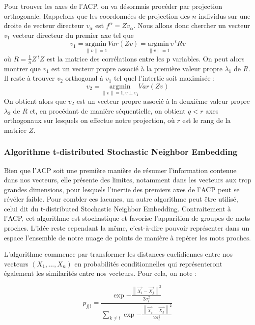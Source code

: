 \documentclass[11pt,french,french]{article}
\begin{document}
Pour trouver les axes de l'ACP, on va désormais procéder par projection
orthogonale. Rappelons que les coordonnées de projection des \(n\)
individus sur une droite de vecteur directeur \(v_\alpha\) est
\(f^\alpha = Zv_\alpha\). Nous allons donc chercher un vecteur \(v_1\)
vecteur directeur du premier axe tel que
\[v_1 =\underset{ \left\| v  \right\| = 1}{\mathrm{argmin~}} Var(Zv) =\underset{ \left\| v  \right\| = 1}{\mathrm{argmin~}} v\,^t R v \]
où \(R = \frac{1}{n} Z\,^t Z\) est la matrice des corrélations entre les
p variables. On peut alors montrer que \(v_1\) est un vecteur propre
associé à la première valeur propre \(\lambda_1\) de \(R\). Il reste à
trouver \(v_2\) orthogonal à \(v_1\) tel quel l'intertie soit maximisée
:
\[v_2 =\underset{ \left\| v  \right\| = 1, v \perp v_1}{\mathrm{argmin}} Var(Zv) \]
On obtient alors que \(v_2\) est un vecteur propre associé à la deuxième
valeur propre \(\lambda_2\) de \(R\) et, en procédant de manière
séquentielle, on obtient \(q < r\) axes orthogonaux sur lesquels on
effectue notre projection, où \(r\) est le rang de la matrice \(Z\).

\subsubsection{Algorithme t-distributed Stochastic Neighbor
Embedding}\label{algorithme-t-distributed-stochastic-neighbor-embedding}

Bien que l'ACP soit une première manière de résumer l'information
contenue dans nos vecteurs, elle présente des limites, notamment dans
les vecteurs aux trop grandes dimensions, pour lesquels l'inertie des
premiers axes de l'ACP peut se révéler faible. Pour combler ces lacunes,
un autre algorithme peut être utilisé, celui dit du t-distributed
Stochastic Neighbor Embedding. Contraitement à l'ACP, cet algorithme est
stochastique et favorise l'apparition de groupes de mots proches. L'idée
reste cependant la même, c'est-à-dire pouvoir représenter dans un espace
l'ensemble de notre nuage de points de manière à repérer les mots
proches.

L'algorithme commence par transformer les distances euclidiennes entre
nos vecteurs \((X_1,...,X_n)\) en probabilités conditionnelles qui
représenteront également les similarités entre nos vecteurs. Pour cela,
on note :

\[ p_{j|i} = \frac{\exp{-\frac{\left\| \vec{X_i} - \vec{X_j}  \right\|^2}{2\sigma_i^2}}}{\sum_{k \neq i}{\exp{-\frac{\left\| \vec{X_i} - \vec{X_k}  \right\|^2}{2\sigma_i^2}}}}\]
\end{document}
